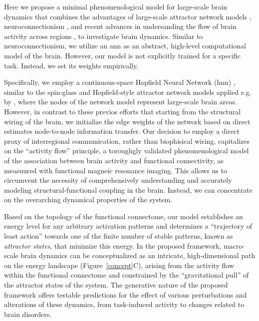 \documentclass{article}
\begin{document}
Here we propose a minimal phenomenological model for large-scale brain dynamics that combines the advantages of large-scale attractor network models \citep{golos2015multistability}, neuroconnectionism \citep{doerig2023neuroconnectionist}, and recent advances in undersanding the flow of brain activity across regions \citep{cole2016activity}, to investigate brain dynamics.
Similar to neuroconnectionism, we utilize an \acrshort{ann} as an abstract, high-level computational model of the brain.
However, our model is not explicitly trained for a specific task. Instead, we set its weights empirically.

Specifically, we employ a continuous-space Hopfield Neural Network (\acrshort{hnn}) \citep{hopfield1982neural, krotov2023new}, similar to the spin-glass and Hopfield-style attractor network models applied e.g. by \citet{deco2012anatomy, golos2015multistability}, where the nodes of the network model represent large-scale brain areas. However, in contrast to these previos efforts that starting from the structural wiring of the brain, we initialize the edge weights of the network based on direct estimates node-to-node information transfer. Our decision to employ a direct proxy of interregional communication, rather than biophisical wiring, capitalizes on the ``activity flow'' \citep{cole2016activity, ito2017cognitive} principle, a toroughgly validated phenomenological model of the association between brain activity and functional connectivity, as measuured with functional magneic resonance imaging.
This allows us to circumvent the necessity of comprehensively understanding and accurately modeling structural-functional coupling in the brain. Instead, we can concentrate on the overarching dynamical properties of the system.

Based on the topology of the functional connectome, our model establishes an energy level for any arbitrary activation patterns and determines a ``trajectory of least action'' towards one of the finite number of stable patterns, known as \textit{attractor states}, that minimize this energy. In the proposed framework, macro-scale brain dynamics can be conceptualized as an intricate, high-dimensional path on the energy landscape (Figure~\ref{concept}C), arising from the activity flow \citep{cole2016activity} within the functional connectome and constrained by the ``gravitational pull'' of the attractor states of the system.
The generative nature of the proposed framework offers testable predictions for the effect of various perturbations and alterations of these dynamics, from task-induced activity to changes related to brain disorders.
\end{document}
